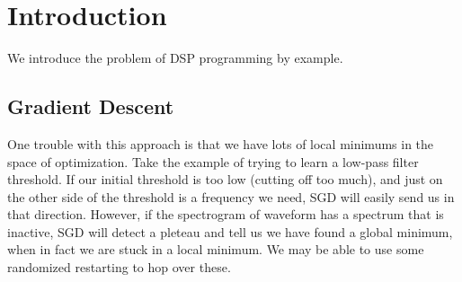 \section{Introduction}

We introduce the problem of DSP programming by example.

\subsection{Gradient Descent}

One trouble with this approach is that we have lots of local minimums in the space of optimization.
Take the example of trying to learn a low-pass filter threshold.
If our initial threshold is too low (cutting off too much), and just on the other side of the threshold is a frequency we need, SGD will easily send us in that direction.
However, if the spectrogram of waveform has a spectrum that is inactive, SGD will detect a pleteau and tell us we have found a global minimum, when in fact we are stuck in a local minimum.
We may be able to use some randomized restarting to hop over these. 
